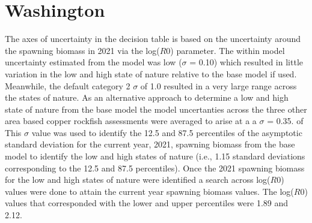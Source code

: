 \documentclass[11pt,
  english,
  a4paper,
]{article}
\begin{document}
\renewcommand{\thetable}{\roman{table}}
\renewcommand{\thefigure}{\roman{figure}}

\setlength\parskip{0.5em plus 0.1em minus 0.2em}

\pagebreak
\setlength{\parskip}{5mm plus1mm minus1mm}
\setcounter{page}{1}
\renewcommand{\thefigure}{\arabic{figure}}
\renewcommand{\thetable}{\arabic{table}}
\setcounter{table}{0}
\setcounter{figure}{0}

\setlength\parskip{0.2em plus 0.1em minus 0.2em}


\hypertarget{washington}{%
\section{Washington}\label{washington}}

\leavevmode\tagmcend\tagstructend


The axes of uncertainty in the decision table is based on the uncertainty around the spawning biomass in 2021 via the log({\(R0\)\leavevmode\tagmcend\tagstructend}) parameter. The within model uncertainty estimated from the model was low ({\(\sigma\)\leavevmode\tagmcend\tagstructend} = 0.10) which resulted in little variation in the low and high state of nature relative to the base model if used. Meanwhile, the default category 2 {\(\sigma\)\leavevmode\tagmcend\tagstructend} of 1.0 resulted in a very large range across the states of nature. As an alternative approach to determine a low and high state of nature from the base model the model uncertanties across the three other area based copper rockfish assessments were averaged to arise at a a {\(\sigma\)\leavevmode\tagmcend\tagstructend} = 0.35. of This {\(\sigma\)\leavevmode\tagmcend\tagstructend} value was used to identify the 12.5 and 87.5 percentiles of the asymptotic standard deviation for the current year, 2021, spawning biomass from the base model to identify the low and high states of nature (i.e., 1.15 standard deviations corresponding to the 12.5 and 87.5 percentiles). Once the 2021 spawning biomass for the low and high states of nature were identified a search across log({\(R0\)\leavevmode\tagmcend\tagstructend}) values were done to attain the current year spawning biomass values. The log({\(R0\)\leavevmode\tagmcend\tagstructend}) values that corresponded with the lower and upper percentiles were 1.89 and 2.12.
\end{document}
